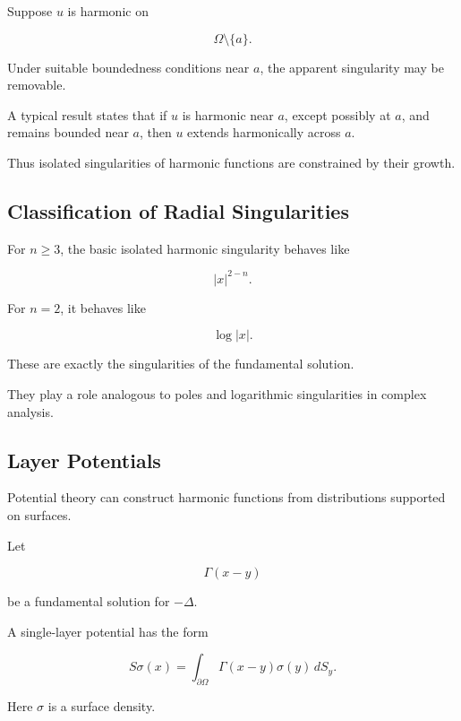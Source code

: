 Suppose \(u\) is harmonic on

\[
\Omega\setminus\{a\}.
\]

Under suitable boundedness conditions near \(a\), the apparent
singularity may be removable.

A typical result states that if \(u\) is harmonic near \(a\), except
possibly at \(a\), and remains bounded near \(a\), then \(u\) extends
harmonically across \(a\).

Thus isolated singularities of harmonic functions are constrained by
their growth.

\subsection{Classification of Radial Singularities}
\label{subsec:radial-singularities}

For \(n\geq3\), the basic isolated harmonic singularity behaves like

\[
\boxed{
|x|^{2-n}.
}
\]

For \(n=2\), it behaves like

\[
\boxed{
\log|x|.
}
\]

These are exactly the singularities of the fundamental solution.

They play a role analogous to poles and logarithmic singularities in
complex analysis.

\subsection{Layer Potentials}
\label{subsec:layer-potentials}

Potential theory can construct harmonic functions from distributions
supported on surfaces.

Let

\[
\Gamma(x-y)
\]

be a fundamental solution for \(-\Delta\).

A single-layer potential has the form

\[
\boxed{
S\sigma(x)
=
\int_{\partial\Omega}
\Gamma(x-y)\sigma(y)\,dS_y.
}
\]

Here \(\sigma\) is a surface density.

